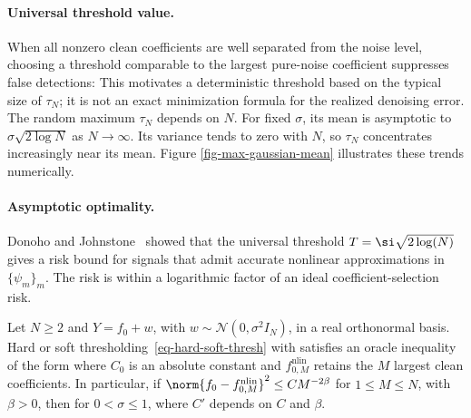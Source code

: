            
                                            
   
                                                     
                           

  
\paragraph{Universal threshold value.}

When all nonzero clean coefficients are well separated from the noise level, choosing a threshold comparable to the largest pure-noise coefficient suppresses false detections:
This motivates a deterministic threshold based on the typical size of $\tau_N$; it is not an exact minimization formula for the realized denoising error.
The random maximum $\tau_N$ depends on $N$. For fixed $\sigma$, its mean is asymptotic to $\sigma\sqrt{2\log N}$ as $N\to\infty$. Its variance tends to zero with $N$, so $\tau_N$ concentrates increasingly near its mean. Figure \ref{fig-max-gaussian-mean} illustrates these trends numerically.



  
\paragraph{Asymptotic optimality.}

Donoho and Johnstone~\cite{donoho-shrinkage} showed that the universal threshold $T = \si \sqrt{2 \log(N)}$ gives a risk bound for signals that admit accurate nonlinear approximations in $\{\psi_m\}_m$. The risk is within a logarithmic factor of an ideal coefficient-selection risk.


\begin{thm}\label{thm-nonlinear-denoising}
Let $N\geq2$ and $Y=f_0+w$, with $w\sim\mathcal N(0,\sigma^2I_N)$, in a real orthonormal basis. Hard or soft thresholding~\eqref{eq-hard-soft-thresh} with
satisfies an oracle inequality of the form
where $C_0$ is an absolute constant and $f_{0,M}^{\mathrm{nlin}}$ retains the $M$ largest clean coefficients. In particular, if $\norm{f_0-f_{0,M}^{\mathrm{nlin}}}^2\leq CM^{-2\beta}$ for $1\leq M\leq N$, with $\beta>0$, then for $0<\sigma\leq1$,
where $C'$ depends on $C$ and $\beta$.
\end{thm}


